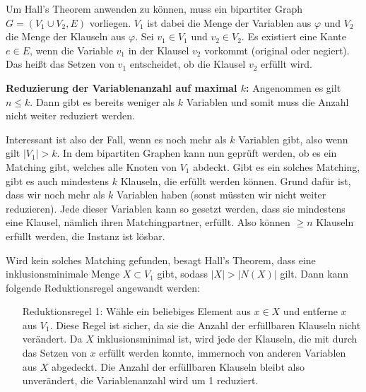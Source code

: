 

\DeclareMathOperator{\vc}{vc}





\subexercise

Um Hall's Theorem anwenden zu können, muss ein bipartiter Graph \linebreak $G=(V_1 \cup V_2,E)$ vorliegen. $V_1$ ist dabei die Menge der Variablen aus $\varphi$ und $V_2$ die Menge der Klauseln aus $\varphi$. Sei $v_1 \in V_1$ und $v_2 \in V_2$. Es existiert eine Kante $e \in E$, wenn die Variable $v_1$ in der Klausel $v_2$ vorkommt (original oder negiert). Das heißt das Setzen von $v_1$ entscheidet, ob die Klausel $v_2$ erfüllt wird.

\textbf{Reduzierung der Variablenanzahl auf maximal $k$:} Angenommen es gilt $n \leq k$. Dann gibt es bereits weniger als $k$ Variablen und somit muss die Anzahl nicht weiter reduziert werden. 

Interessant ist also der Fall, wenn es noch mehr als $k$ Variablen gibt, also wenn gilt $|V_1| > k$. In dem bipartiten Graphen kann nun geprüft werden, ob es ein Matching gibt, welches alle Knoten von $V_1$ abdeckt. Gibt es ein solches Matching, gibt es auch mindestens $k$ Klauseln, die erfüllt werden können. Grund dafür ist, dass wir noch mehr als $k$ Variablen haben (sonst müssten wir nicht weiter reduzieren). Jede dieser Variablen kann so gesetzt werden, dass sie mindestens eine Klausel, nämlich ihren Matchingpartner, erfüllt. Also können $\geq n$ Klauseln erfüllt werden, die Instanz ist lösbar. 

Wird kein solches Matching gefunden, besagt Hall's Theorem, dass eine inklusionsminimale Menge $X\subset V_1$ gibt, sodass $|X| > |N(X)|$ gilt. Dann kann folgende Reduktionsregel angewandt werden:

\begin{itemize}
\item[Reduktionsregel 1:] Wähle ein beliebiges Element aus $x \in X$ und entferne $x$ aus $V_1$. Diese Regel ist sicher, da sie die Anzahl der erfüllbaren Klauseln nicht verändert. Da $X$ inklusionsminimal ist, wird jede der Klauseln, die mit durch das Setzen von $x$ erfüllt werden konnte, immernoch von anderen Variablen aus $X$ abgedeckt. Die Anzahl der erfüllbaren Klauseln bleibt also unverändert, die Variablenanzahl wird um 1 reduziert.
\end{itemize}

